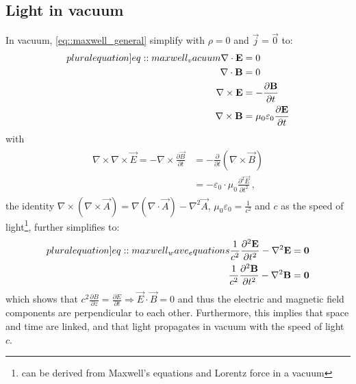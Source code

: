 \subsection{Light in vacuum}
%
In vacuum, \cref{eq::maxwell_general} simplify with $\rho = 0$ and $\vec{j} = \vec{0}$ to:
%
\begin{align}
\begin{split} \label[pluralequation]{eq::maxwell_vacuum}
  \nabla \cdot \vec{E} &= 0 \quad\\
  \nabla \cdot \vec{B} &= 0 \quad\\
  \nabla \times \vec{E} &= -\frac{\partial\vec B}{\partial t}\\
  \nabla \times \vec{B} &= \mu_0\varepsilon_0 \frac{\partial\vec E}{\partial t}
  \end{split}
\end{align}
%
with
\begin{align}
\begin{split}
    \nabla \times \nabla \times \vec{E} = -\nabla \times \frac{\partial \vec{B}} {\partial t} &= -\frac{\partial} {\partial t} \left( \nabla \times  \vec{B} \right)\\
    &= -\varepsilon_0 \cdot \mu_0 \frac{\partial^2 \vec{E}}{\partial t^2} \, ,
\end{split}
\end{align}
%
the identity $\nabla \times \left( \nabla \times \vec{A} \right) = \nabla(\nabla \cdot \vec{A}) - \nabla^{2}\vec{A}$, $\mu_0\varepsilon_0 = \frac{1}{c^2}$ and $c$ as the speed of light\footnote{can be derived from Maxwell's equations and Lorentz force in a vacuum}, further simplifies to:
%
\begin{align}
\begin{split} \label[pluralequation]{eq::maxwell_wave_equations}
  \frac{1}{c^2} \frac{\partial^2 \vec{E}}{\partial t^2} - \nabla^2 \vec{E} &= \vec{0} \\
  \frac{1}{c^2} \frac{\partial^2 \vec{B}}{\partial t^2} - \nabla^2 \vec{B} &= \vec{0}
\end{split}
\end{align}
%
which shows that $c^2 \frac{\partial B} {\partial z} = \frac{\partial E}{\partial t} \Rightarrow \vec{E} \cdot \vec{B} = 0$ and thus the electric and magnetic field components are perpendicular to each other.
Furthermore, this implies that space and time are linked, and that light propagates in vacuum with the speed of light $c$.
%
%
%
